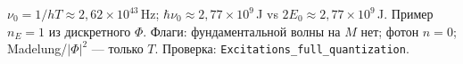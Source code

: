 $\nu_0=1/hT\approx2{,}62\times 10^{43}\,$Hz;
$\hbar\nu_0\approx2{,}77\times 10^{9}\,$J vs $2E_0\approx2{,}77\times 10^{9}\,$J.
Пример $n_E=1$ из дискретного $\Phi$.
Флаги: фундаментальной волны на $M$ нет; фотон $n=0$; Madelung/$|\Phi|^2$ --- только $T$.
Проверка: \texttt{Excitations\_full\_quantization}.
